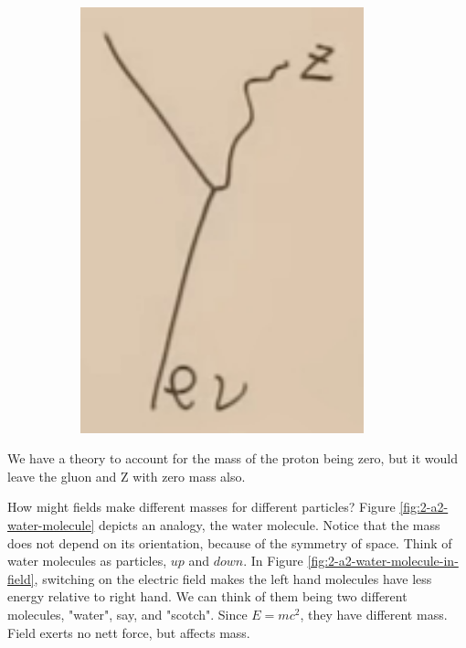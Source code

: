 \documentclass[]{article}
\begin{document}
\begin{appendices}
\begin{figure}[H]
\begin{subfigure}[t]{0.3\textwidth}
			\includegraphics[width=0.9\textwidth]{2-a2-feynman3}
		\end{subfigure}
	\end{figure} 
	
	We have a theory to account for the mass of the proton being zero, but it would leave the gluon and Z with zero mass also.
	
	How might fields make different masses for different particles? Figure \ref{fig:2-a2-water-molecule} depicts an analogy, the water molecule. Notice that the mass does not depend on its orientation, because of the symmetry of space. Think of water molecules as particles, $up$ and $down$. In Figure \ref{fig:2-a2-water-molecule-in-field}, switching on the electric field makes the left hand molecules have less energy relative to right hand. We can think of them being two different molecules, "water", say, and "scotch". Since $E=mc^2$, they have different mass. Field exerts no nett force, but affects mass.  
	

\end{appendices}
\end{document}
